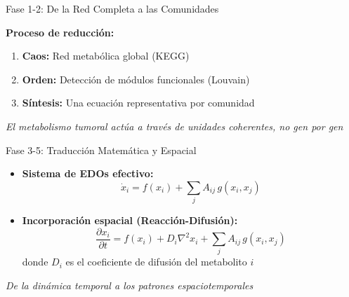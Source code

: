 \documentclass[aspectratio=169, 11pt]{beamer}
\begin{document}
	\begin{frame}{Fase 1-2: De la Red Completa a las Comunidades}
		\centering
		
		\vspace{0.3cm}
		\textbf{Proceso de reducción:}
		\begin{enumerate}
			\item \textbf{Caos:} Red metabólica global (KEGG)
			\item \textbf{Orden:} Detección de módulos funcionales (Louvain)
			\item \textbf{Síntesis:} Una ecuación representativa por comunidad
		\end{enumerate}
		
		\vspace{0.2cm}
		\footnotesize \textit{El metabolismo tumoral actúa a través de unidades coherentes, no gen por gen}
	\end{frame}
	
	\begin{frame}{Fase 3-5: Traducción Matemática y Espacial}
		\begin{itemize}
			\item \textbf{Sistema de EDOs efectivo:}
			\begin{equation}
				\dot{x}_i = f(x_i) + \sum_{j} A_{ij} \, g(x_i, x_j)
			\end{equation}
			
			\vspace{0.2cm}
			\item \textbf{Incorporación espacial (Reacción-Difusión):}
			\begin{equation}
				\frac{\partial x_i}{\partial t} = f(x_i) + D_i \nabla^2 x_i + \sum_{j} A_{ij} \, g(x_i, x_j)
			\end{equation}
			donde $D_i$ es el coeficiente de difusión del metabolito $i$
		\end{itemize}
		
		\vspace{0.3cm}
		\centering
		\footnotesize \textit{De la dinámica temporal a los patrones espaciotemporales}
	\end{frame}
	
\end{document}

